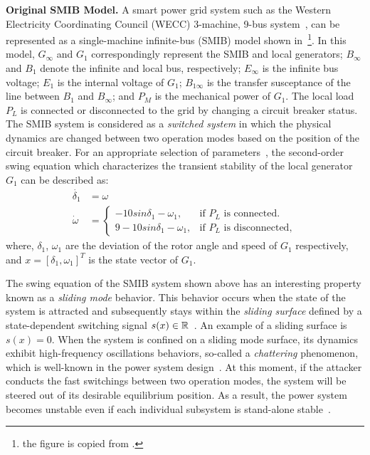 \vspace{0.5em}
\noindent
{\bf Original SMIB Model.}
A smart power grid system such as the Western Electricity Coordinating
Council (WECC) 3-machine, 9-bus system~\cite{sauer1998power}, can be represented as a single-machine infinite-bus (SMIB) model shown in~\footnote{the figure is copied from \cite{farraj2014practical}.}. In this model, $G_\infty$ and $G_1$ correspondingly represent the SMIB and local generators; $B_\infty$ and $B_1$ denote the infinite and local bus, respectively; $E_\infty$ is the infinite bus voltage; $E_1$ is the internal voltage of $G_1$; $B_{1\infty}$ is the transfer susceptance of the line between $B_1$ and $B_\infty$; and $P_M$ is the mechanical power of $G_1$. The local load $P_L$ is connected or disconnected to the grid by changing a circuit breaker status. 
%
The SMIB system is considered as a \emph{switched system} in which the physical dynamics are changed between two operation modes based on the position of the circuit breaker. 
%
%
For an appropriate selection of parameters~\cite{farraj2014practical}, the second-order swing equation which characterizes the transient stability of the local generator $G_1$ can be described as:
%
\begin{align}
\dot{\delta_1} & = \omega \nonumber \\
\dot{\omega} & = 
\begin{cases}
    -10sin\delta_1 - \omega_1, & \text{if $P_L$ is connected}.\\
    9 - 10sin\delta_1 - \omega_1, & \text{if $P_L$ is disconnected},
 \end{cases} \nonumber
\end{align}
%
where, $\delta_1$, $\omega_1$ are the deviation of the rotor angle and speed of $G_1$ respectively, and $x = [\delta_1,\omega_1]^T$ is the state vector of $G_1$.
%
%

The swing equation of the SMIB system shown above has an interesting property known as a \emph{sliding mode} behavior. This behavior occurs when the state of the system is attracted and subsequently stays within the \emph{sliding surface} defined by a state-dependent switching signal $s(x)\in\mathbb{R}$~\cite{decarlo1988variable, liu2014coordinated}. An example of a sliding surface is $s(x) = 0$. When the system is confined on a sliding mode surface, its dynamics exhibit high-frequency oscillations behaviors, so-called a \emph{chattering} phenomenon, which is well-known in the power system design~\cite{sabanovic2004variable}.
%
At this moment, if the attacker conducts the fast switchings between two  operation modes, the system will be steered out of its desirable equilibrium position. As a result, the power system becomes unstable even if each individual subsystem is  stand-alone stable~\cite{liu2014coordinated}.  
% 

